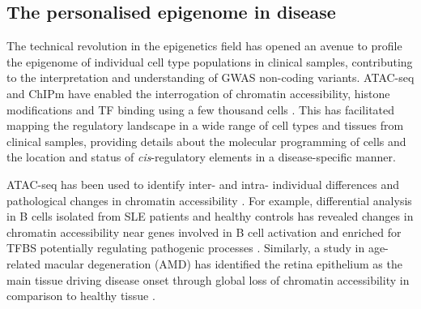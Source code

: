 \subsection{The personalised epigenome in disease}

The technical revolution in the epigenetics field has opened an avenue to profile the epigenome of individual cell type populations in clinical samples, contributing to the interpretation and understanding of GWAS non-coding variants. ATAC-seq and ChIPm have enabled the interrogation of chromatin accessibility, histone modifications and TF binding using a few thousand cells \parencite{Buenrostro2013, Schmidl2015}. This has facilitated mapping the regulatory landscape in a wide range of cell types and tissues from clinical samples, providing details about the molecular programming of cells and the location and status of \textit{cis}-regulatory elements in a disease-specific manner. 

ATAC-seq has been used to identify inter- and intra- individual differences and pathological changes in chromatin accessibility \parencite{Qu2015}. For example, differential analysis in B cells isolated from SLE patients and healthy controls has revealed changes in chromatin accessibility near genes involved in B cell activation and enriched for TFBS potentially regulating pathogenic processes \parencite{Scharer2016}. Similarly, a study in age-related macular degeneration (AMD) has identified the retina epithelium as the main tissue driving disease onset through global loss of chromatin accessibility in comparison to healthy tissue \parencite{Wang2018}. %

